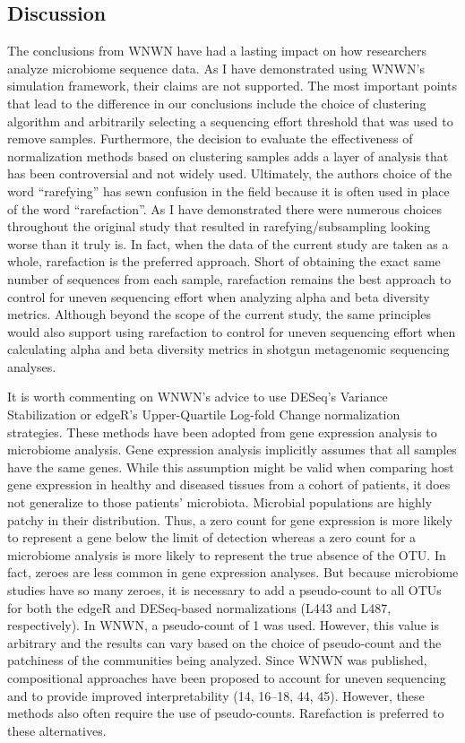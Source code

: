 \documentclass[
]{article}
\begin{document}
\hypertarget{discussion}{%
\subsection{Discussion}\label{discussion}}

The conclusions from WNWN have had a lasting impact on how researchers
analyze microbiome sequence data. As I have demonstrated using WNWN's
simulation framework, their claims are not supported. The most important
points that lead to the difference in our conclusions include the choice
of clustering algorithm and arbitrarily selecting a sequencing effort
threshold that was used to remove samples. Furthermore, the decision to
evaluate the effectiveness of normalization methods based on clustering
samples adds a layer of analysis that has been controversial and not
widely used. Ultimately, the authors choice of the word ``rarefying''
has sewn confusion in the field because it is often used in place of the
word ``rarefaction''. As I have demonstrated there were numerous choices
throughout the original study that resulted in rarefying/subsampling
looking worse than it truly is. In fact, when the data of the current
study are taken as a whole, rarefaction is the preferred approach. Short
of obtaining the exact same number of sequences from each sample,
rarefaction remains the best approach to control for uneven sequencing
effort when analyzing alpha and beta diversity metrics. Although beyond
the scope of the current study, the same principles would also support
using rarefaction to control for uneven sequencing effort when
calculating alpha and beta diversity metrics in shotgun metagenomic
sequencing analyses.

It is worth commenting on WNWN's advice to use DESeq's Variance
Stabilization or edgeR's Upper-Quartile Log-fold Change normalization
strategies. These methods have been adopted from gene expression
analysis to microbiome analysis. Gene expression analysis implicitly
assumes that all samples have the same genes. While this assumption
might be valid when comparing host gene expression in healthy and
diseased tissues from a cohort of patients, it does not generalize to
those patients' microbiota. Microbial populations are highly patchy in
their distribution. Thus, a zero count for gene expression is more
likely to represent a gene below the limit of detection whereas a zero
count for a microbiome analysis is more likely to represent the true
absence of the OTU. In fact, zeroes are less common in gene expression
analyses. But because microbiome studies have so many zeroes, it is
necessary to add a pseudo-count to all OTUs for both the edgeR and
DESeq-based normalizations (L443 and L487, respectively). In WNWN, a
pseudo-count of 1 was used. However, this value is arbitrary and the
results can vary based on the choice of pseudo-count and the patchiness
of the communities being analyzed. Since WNWN was published,
compositional approaches have been proposed to account for uneven
sequencing and to provide improved interpretability (14, 16--18, 44,
45). However, these methods also often require the use of pseudo-counts.
Rarefaction is preferred to these alternatives.
\end{document}
